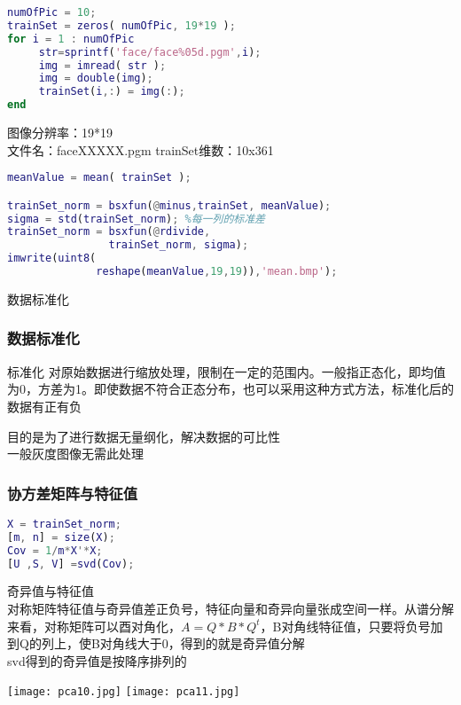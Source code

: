\begin{frame}[fragile]
\begin{lstlisting}[language=Matlab]
numOfPic = 10;
trainSet = zeros( numOfPic, 19*19 ); 
for i = 1 : numOfPic
     str=sprintf('face/face%05d.pgm',i);
     img = imread( str );   
     img = double(img);
     trainSet(i,:) = img(:);
end
\end{lstlisting}
图像分辨率：19*19\\
文件名：faceXXXXX.pgm
trainSet维数：10x361
\end{frame}


\begin{frame}[fragile]
\begin{lstlisting}[language=Matlab]
meanValue = mean( trainSet );

trainSet_norm = bsxfun(@minus,trainSet, meanValue);
sigma = std(trainSet_norm); %每一列的标准差
trainSet_norm = bsxfun(@rdivide, 
                trainSet_norm, sigma);
imwrite(uint8(
              reshape(meanValue,19,19)),'mean.bmp');
\end{lstlisting}
数据标准化
\end{frame}

\begin{frame}
\frametitle{数据标准化}
\begin{block}{标准化}
对原始数据进行缩放处理，限制在一定的范围内。一般指正态化，即均值为0，方差为1。即使数据不符合正态分布，也可以采用这种方式方法，标准化后的数据有正有负
\end{block}
目的是为了进行数据无量纲化，解决数据的可比性\\
一般灰度图像无需此处理
\end{frame}


\begin{frame}[fragile]
\frametitle{协方差矩阵与特征值}
\begin{lstlisting}[language=Matlab]
X = trainSet_norm;
[m, n] = size(X);
Cov = 1/m*X'*X;
[U ,S, V] =svd(Cov);
\end{lstlisting}
奇异值与特征值\\
对称矩阵特征值与奇异值差正负号，特征向量和奇异向量张成空间一样。从谱分解来看，对称矩阵可以酉对角化，$A=Q*B*Q^t$，B对角线特征值，只要将负号加到Q的列上，使B对角线大于0，得到的就是奇异值分解\\
svd得到的奇异值是按降序排列的
\end{frame}
\begin{frame}
\texttt{[image: pca10.jpg]}
\texttt{[image: pca11.jpg]}
\end{frame}

